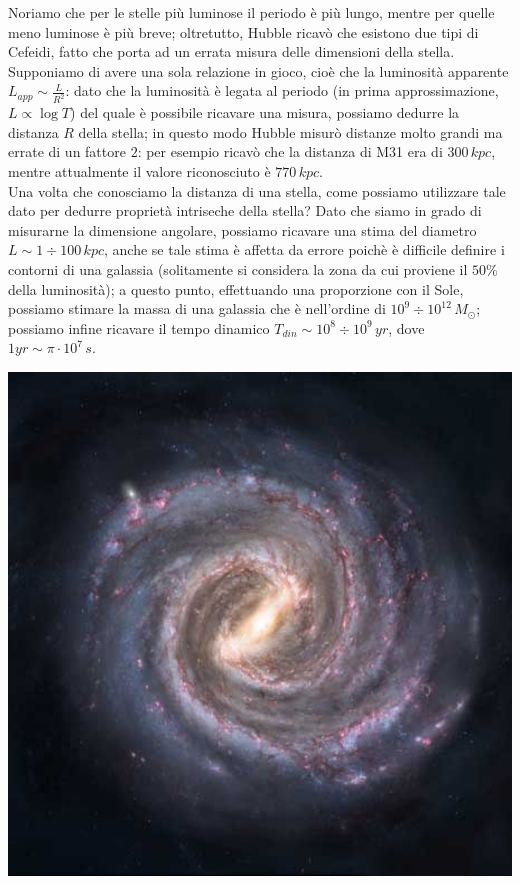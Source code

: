 Noriamo che per le stelle più luminose il periodo è più lungo, mentre per quelle meno luminose è più breve; oltretutto, Hubble ricavò che esistono due tipi di Cefeidi, fatto che porta ad un errata misura delle dimensioni della stella. Supponiamo di avere una sola relazione in gioco, cioè che la luminosità apparente $L_ {app} \sim \frac{L}{R^2}$: dato che la luminosità è legata al periodo (in prima approssimazione, $L \propto \log T$) del quale è possibile ricavare una misura, possiamo dedurre la distanza $R$ della stella; in questo modo Hubble misurò distanze molto grandi ma errate di un fattore $2$: per esempio ricavò che la distanza di M31 era di $300 \, kpc$, mentre attualmente il valore riconosciuto è $770 \, kpc$.
\\
Una volta che conosciamo la distanza di una stella, come possiamo utilizzare tale dato per dedurre proprietà intriseche della stella? Dato che siamo in grado di misurarne la dimensione angolare, possiamo ricavare una stima del diametro $L \sim 1 \div 100 \, kpc$, anche se tale stima è affetta da errore poichè è difficile definire i contorni di una galassia (solitamente si considera la zona da cui proviene il $50 \%$ della luminosità); a questo punto, effettuando una proporzione con il Sole, possiamo stimare la massa di una galassia che è nell'ordine di $10^9 \div 10^{12} \, M_{\odot}$; possiamo infine ricavare il tempo dinamico $T_{din} \sim 10^8 \div 10^9 \, yr$, dove $1 yr \sim \pi \cdot 10^7 \, s$.
\\
\begin{minipage}{.35\textwidth}
\centering
\includegraphics[width=1\textwidth]{Img/via_lattea.jpg}
\end{minipage}
